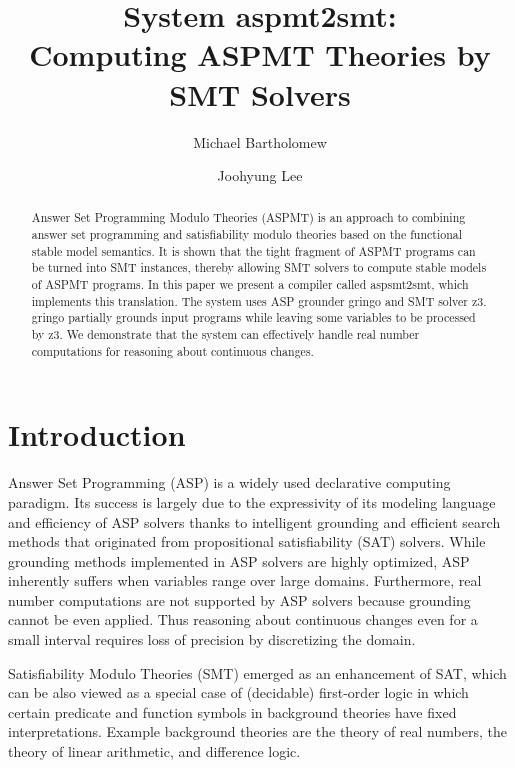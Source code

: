 \documentclass[runningheads]{llncs}
\title{System {\sc aspmt2smt}: \\ Computing ASPMT Theories by SMT Solvers}
\author{Michael Bartholomew \and Joohyung Lee}
\institute{
School of Computing, Informatics, and Decision Systems Engineering \\
Arizona State University, Tempe, USA \\
{\tt \{mjbartho,joolee\}@asu.edu}}
\begin{document}
\maketitle

\begin{abstract}
Answer Set Programming Modulo Theories (ASPMT) is an approach to
combining answer set programming and satisfiability modulo theories
based on the functional stable model semantics. It is shown that the
tight fragment of ASPMT programs can be turned into SMT instances,
thereby allowing SMT solvers to compute stable models of ASPMT
programs. In this paper we present a compiler called {\sc aspsmt2smt},
which implements this translation. The system uses ASP grounder {\sc
 gringo} and SMT solver {\sc z3}. {\sc gringo} partially grounds
input programs while leaving some variables to be processed by {\sc
  z3}. We demonstrate that the system can effectively handle real
number computations for reasoning about continuous changes. 
\end{abstract} 

\section{Introduction}

Answer Set Programming (ASP) is a widely used declarative computing
paradigm. Its success is largely due to the expressivity of its
modeling language and efficiency of ASP solvers thanks to intelligent
grounding and efficient search methods that originated from
propositional satisfiability (SAT) solvers.
While grounding methods implemented in ASP solvers are highly
optimized, ASP inherently suffers when variables range over large
domains. Furthermore, real number computations are not supported by
ASP solvers because grounding cannot be even applied. Thus reasoning
about continuous changes even for a small interval requires loss of
precision by discretizing the domain. 

Satisfiability Modulo Theories (SMT) emerged as an
enhancement of SAT, which can be also viewed as a special case of
(decidable) first-order logic in which certain predicate and function
symbols in background theories have fixed interpretations. Example
background theories are the theory of real numbers, the theory of
linear arithmetic, and difference logic.
\end{document}
